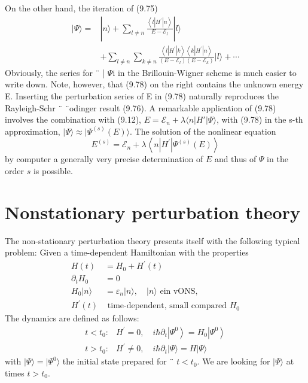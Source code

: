 On the other hand, the iteration of (9.75)
\begin{equation}
\begin{aligned}|\Psi\rangle=&|n\rangle+\sum_{l \neq n} \frac{\left\langle l\left|H^{\prime}\right| n\right\rangle}{E-\mathcal{E}_{l}}|l\rangle \\ &+\sum_{l \neq n} \sum_{k \neq n} \frac{\left\langle l\left|H^{\prime}\right| k\right\rangle\left\langle k\left|H^{\prime}\right| n\right\rangle}{\left(E-\mathcal{E}_{l}\right)\left(E-\mathcal{E}_{k}\right)}|l\rangle+\cdots \end{aligned}
\end{equation}
Obviously, the series for ¨ | $\Psi$i in the Brillouin-Wigner scheme is much easier to write down. Note, however, that (9.78) on the right contains the unknown energy E. Inserting the perturbation series of E in (9.78) naturally reproduces the Rayleigh-Schr ¨ ¨odinger result (9.76). A remarkable application of (9.78) involves the combination with (9.12), $E = \mathcal{E}_n + \lambda \langle n | H' | \Psi\rangle$, with (9.78) in the s-th approximation, $| \Psi\rangle  \approx | \Psi^{(s)} (E) \rangle$. The solution of the nonlinear equation
\begin{equation}
    E^{(s)}=\mathcal{E}_{n}+\lambda\left\langle n\left|H^{\prime}\right| \Psi^{(s)}(E)\right\rangle
    \end{equation}
by computer a generally very precise determination of $E$ and thus of $\Psi$ in the order $s$ is possible.

\section{Nonstationary perturbation theory}
The non-stationary perturbation theory presents itself with the following typical problem: Given a time-dependent Hamiltonian with the properties
%
\begin{equation}
\begin{aligned} H(t) &=H_{0}+H^{\prime}(t) \\ \partial_{t} H_{0} &=0 \\ H_{0}|n\rangle &=\varepsilon_{n}|n\rangle, \quad|n\rangle \text { ein vONS, } \\ H^{\prime}(t) & \text { time-dependent, small compared } H_{0} \end{aligned}
\end{equation}
The dynamics are defined as follows:
\begin{equation}
\begin{array}{ll}{t<t_{0}:} & {H^{\prime}=0, \quad i \hbar \partial_{t}\left|\Psi^{0}\right\rangle= H_{0}\left|\Psi^{0}\right\rangle} \\ { t>t_{0}:} & {H^{\prime} \neq 0, \quad i \hbar \partial_{t}|\Psi\rangle= H|\Psi\rangle}\end{array}
\end{equation}
with $|\Psi\rangle = | \Psi^0\rangle$ the initial state prepared for ¨ $t <t_0$. We are looking for $|\Psi\rangle$ at times $t> t_0$.

